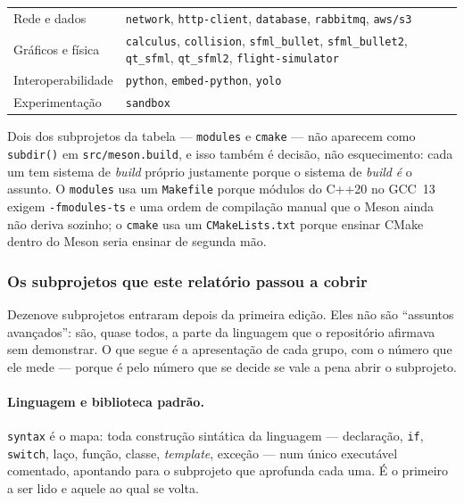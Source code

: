 \begin{table}[htbp]
\begin{tabular}{@{}lp{}@{}}
Rede e dados         & \texttt{network}, \texttt{http-client},
                       \texttt{database}, \texttt{rabbitmq}, \texttt{aws/s3} \\
Gráficos e física    & \texttt{calculus}, \texttt{collision},
                       \texttt{sfml\_bullet}, \texttt{sfml\_bullet2},
                       \texttt{qt\_sfml}, \texttt{qt\_sfml2},
                       \texttt{flight-simulator} \\
Interoperabilidade   & \texttt{python}, \texttt{embed-python}, \texttt{yolo} \\
Experimentação       & \texttt{sandbox} \\
\bottomrule
\end{tabular}
\end{table}

Dois dos subprojetos da tabela --- \texttt{modules} e \texttt{cmake} --- não
aparecem como \texttt{subdir()} em \texttt{src/meson.build}, e isso também é
decisão, não esquecimento: cada um tem sistema de \emph{build} próprio
justamente porque o sistema de \emph{build} \emph{é} o assunto. O
\texttt{modules} usa um \texttt{Makefile} porque módulos do C++20 no GCC~13
exigem \texttt{-fmodules-ts} e uma ordem de compilação manual que o Meson ainda
não deriva sozinho; o \texttt{cmake} usa um \texttt{CMakeLists.txt} porque
ensinar CMake dentro do Meson seria ensinar de segunda mão.

\subsubsection{Os subprojetos que este relatório passou a cobrir}
\label{sec:novos-subprojetos}

Dezenove subprojetos entraram depois da primeira edição. Eles não são
``assuntos avançados'': são, quase todos, a parte da linguagem que o
repositório afirmava sem demonstrar. O que segue é a apresentação de cada
grupo, com o número que ele mede --- porque é pelo número que se decide se vale
a pena abrir o subprojeto.

\paragraph{Linguagem e biblioteca padrão.}
\texttt{syntax} é o mapa: toda construção sintática da linguagem
--- declaração, \texttt{if}, \texttt{switch}, laço, função, classe,
\emph{template}, exceção --- num único executável comentado, apontando para o
subprojeto que aprofunda cada uma. É o primeiro a ser lido e aquele ao qual se
volta.

